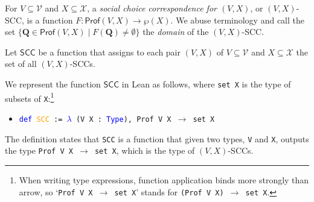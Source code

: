 \documentclass[runningheads]{llncs}
\begin{document}



\begin{definition} \textnormal{For $V\subseteq\mathcal{V}$ and $X\subseteq\mathcal{X}$, a \textit{social choice correspondence for $(V,X)$}, or $(V,X)$-SCC, is a function  $F: \mathsf{Prof}(V,X)\to \wp(X)$. We abuse terminology and call the set $\{\mathbf{Q}\in\mathsf{Prof}(V,X)\mid F(\mathbf{Q})\neq\emptyset \}$ the \textit{domain} of the $(V,X)$-SCC.}

\textnormal{Let $\mathsf{SCC}$ be a function that assigns to each pair $(V,X)$ of $V\subseteq\mathcal{V}$ and $X\subseteq\mathcal{X}$ the set of all $(V,X)$-SCCs.}
\end{definition}

We represent the function $\mathsf{SCC}$ in Lean as follows, where \texttt{set X} is the type of subsets of \texttt{X}:\footnote{When writing type expressions, function application binds more strongly than arrow, so `\texttt{Prof V X $\to$ set X}' stands for \texttt{(Prof V X) $\to$ set X}.}
\begin{itemize}
\item[] \texttt{\textcolor{blue}{def} \textcolor{orange}{SCC} := \textcolor{blue}{$\lambda$} (V X : \textcolor{blue}{Type}), Prof V X $\to$ set X}
\end{itemize}
The definition states that \texttt{SCC} is a function that given two types, \texttt{V} and \texttt{X}, outputs the type \texttt{Prof V X $\to$ set X}, which is the type of $(V,X)$-SCCs.

\end{document}
